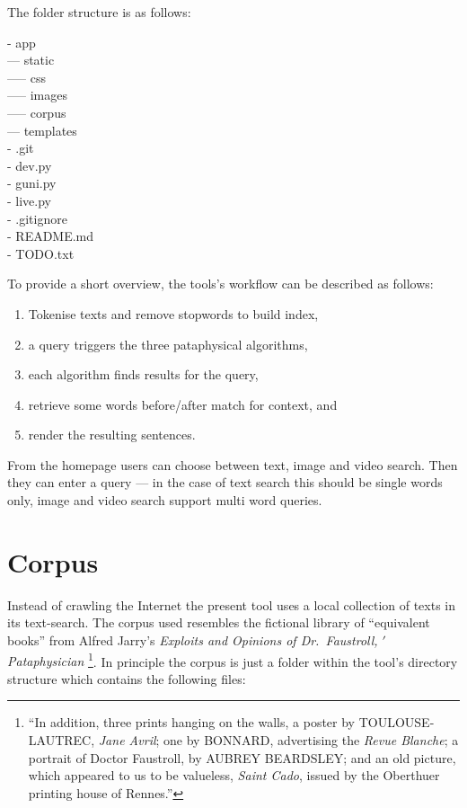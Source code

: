The folder structure is as follows:

- app\\
--- static\\
----- css\\
----- images\\
----- corpus\\
--- templates\\
- .git\\
- dev.py\\
- guni.py\\
- live.py\\
- .gitignore\\
- README.md\\
- TODO.txt


\begin{fcom}
  To provide a short overview, the tools’s workflow can be described as follows:
  \begin{enumerate}
    \item Tokenise texts and remove stopwords to build index,
    \item a query triggers the three pataphysical algorithms,
    \item each algorithm finds results for the query,
    \item retrieve some words before/after match for context, and
    \item render the resulting sentences.
  \end{enumerate}
\end{fcom}


From the homepage users can choose between text, image and video search. Then they can enter a query --- in the case of text search this should be single words only, image and video search support multi word queries.


\section{Corpus}

Instead of crawling the Internet the present tool uses a local collection of texts in its text-search. The corpus used resembles the fictional library of ``equivalent books'' from Alfred Jarry's \emph{Exploits and Opinions of Dr.\ Faustroll, $'$Pataphysician} \citeyear[p.10-12]{Jarry1996}\footnote{``In addition, three prints hanging on the walls, a poster by TOULOUSE-LAUTREC, \emph{Jane Avril}; one by BONNARD, advertising the \emph{Revue Blanche}; a portrait of Doctor Faustroll, by AUBREY BEARDSLEY\@; and an old picture, which appeared to us to be valueless, \emph{Saint Cado}, issued by the Oberthuer printing house of Rennes.''\parencite[p.12]{Jarry1996}}. In principle the \hypertarget{corpus}{corpus}\label{ref:corpus} is just a folder within the tool's directory structure which contains the following files:

